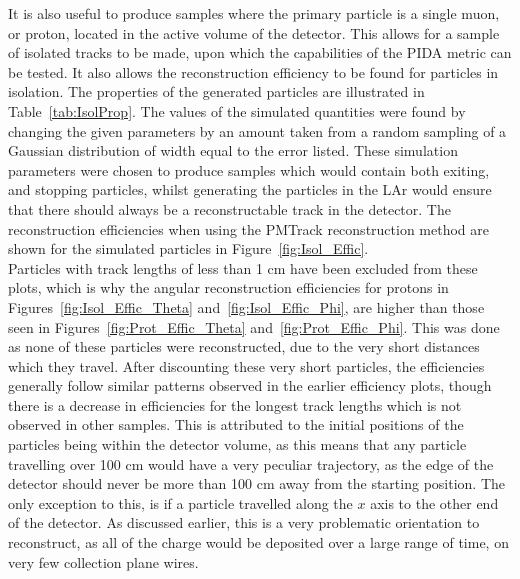 It is also useful to produce samples where the primary particle is a single muon, or proton, located in the active volume of the detector. This allows for a sample of isolated tracks to be made, upon which the capabilities of the PIDA metric can be tested. It also allows the reconstruction efficiency to be found for particles in isolation. The properties of the generated particles are illustrated in Table~\ref{tab:IsolProp}. The values of the simulated quantities were found by changing the given parameters by an amount taken from a random sampling of a Gaussian distribution of width equal to the error listed. These simulation parameters were chosen to produce samples which would contain both exiting, and stopping particles, whilst generating the particles in the LAr would ensure that there should always be a reconstructable track in the detector. The reconstruction efficiencies when using the PMTrack reconstruction method are shown for the simulated particles in Figure~\ref{fig:Isol_Effic}. \\


Particles with track lengths of less than 1 cm have been excluded from these plots, which is why the angular reconstruction efficiencies for protons in Figures~\ref{fig:Isol_Effic_Theta} and~\ref{fig:Isol_Effic_Phi}, are higher than those seen in Figures~\ref{fig:Prot_Effic_Theta} and~\ref{fig:Prot_Effic_Phi}. This was done as none of these particles were reconstructed, due to the very short distances which they travel. After discounting these very short particles, the efficiencies generally follow similar patterns observed in the earlier efficiency plots, though there is a decrease in efficiencies for the longest track lengths which is not observed in other samples. This is attributed to the initial positions of the particles being within the detector volume, as this means that any particle travelling over 100 cm would have a very peculiar trajectory, as the edge of the detector should never be more than 100 cm away from the starting position. The only exception to this, is if a particle travelled along the $x$ axis to the other end of the detector. As discussed earlier, this is a very problematic orientation to reconstruct, as all of the charge would be deposited over a large range of time, on very few collection plane wires. \\

